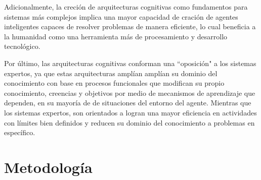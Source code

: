  Adicionalmente, la creci\'{o}n de arquitecturas cognitivas como fundamentos para sistemas m\'{a}s complejos implica una mayor capacidad de craci\'{o}n de agentes inteligentes capaces de resolver problemas de manera eficiente, lo cual beneficia a la humanidad como una herramienta m\'{a}s de procesamiento y desarrollo tecnol\'{o}gico.
 
 Por \'{u}ltimo, las arquitecturas cognitivas conforman una “oposici\'{o}n" a los sistemas expertos, ya que estas arquitecturas ampl\'{i}an ampl\'{i}an su dominio del conocimiento con base en procesos funcionales que modifican su propio conocimiento, creencias y objetivos por medio de mecanismos de aprendizaje que dependen, en su mayor\'{i}a de de situaciones del entorno del agente. Mientras que los sistemas expertos, son orientados a logran una mayor eficiencia en actividades con l\'{i}mites bien definidos y reducen su dominio del conocimiento a problemas en espec\'{i}fico.
 
 \section{Metodolog\'{i}a}